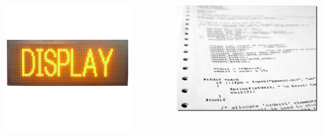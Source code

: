 \begin{snimka}
\begin{columns}[c]
   {
    \begin{column}{0.6\textwidth}
     \begin{center}
        \includegraphics[width=0.8\textwidth]{obr/zobr.jpg}
      \end{center}
    \end{column}
    }

   {
    \begin{column}{0.6\textwidth}
     \begin{center}
        \includegraphics[width=0.8\textwidth]{obr/source.jpg}
      \end{center}
    \end{column}
    }


\end{columns}
\end{snimka}

